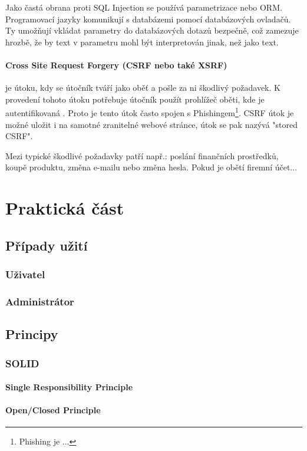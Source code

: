 \documentclass[12pt, a4paper]{article}
\begin{document}
Jako častá obrana proti SQL Injection se používá parametrizace nebo ORM. Programovací jazyky komunikují s databázemi pomocí databázových ovladačů. Ty umožňují vkládat parametry do databázových dotazů bezpečně, což zamezuje hrozbě, že by text v parametru mohl být interpretován jinak, než jako text.
\paragraph{Cross Site Request Forgery (CSRF nebo také XSRF)}
je útoku, kdy se útočník tváří jako oběť a pošle za ni škodlivý požadavek. K provedení tohoto útoku potřebuje útočník použít prohlížeč oběti, kde je autentifikovaná . Proto je tento útok často spojen s Phishingem\footnote{Phishing je ...}. CSRF útok je možné uložit i na samotné zranitelné webové stránce, útok se pak nazývá "stored CSRF".

Mezi typické škodlivé požadavky patří např.: poslání finančních prostředků, koupě produktu, změna e-mailu nebo změna hesla. Pokud je obětí firemní účet...
\cite{the_owasp_foundation_cross_nodate}

\section{Praktická část}
\subsection{Případy užití}
\subsubsection{Uživatel}
\subsubsection{Administrátor}
\subsection{Principy}
\subsubsection{SOLID}
\paragraph{Single Responsibility Principle}
\paragraph{Open/Closed Principle}
\end{document}
